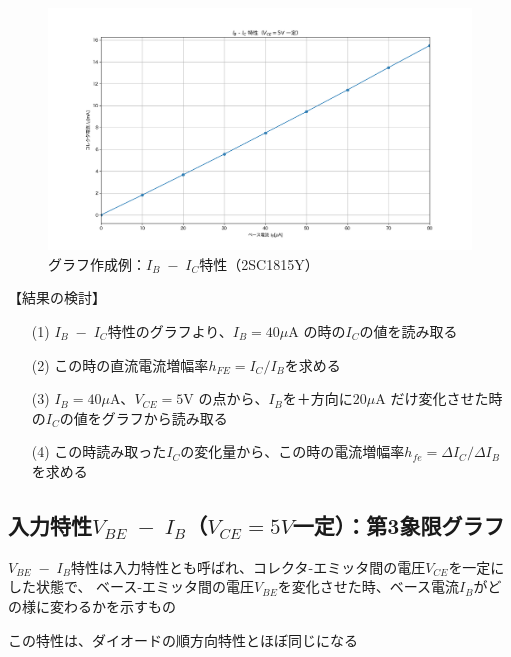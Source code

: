 \documentclass[uplatex,a4paper,11pt,oneside,openany]{jsbook}
\begin{document}
\begin{figure}[H]
  \centering
   \includegraphics[keepaspectratio, scale=0.45, angle=0]
               {figs/png/x2static.png}
               \caption{グラフ作成例：$I_B\;-\;I_C$特性（2SC1815Y）}
               \label{fig:iocharM1Yd}
\end{figure}

【結果の検討】

\begin{enumerate}
\item[(1)] $I_B\;-\;I_C$特性のグラフより、$I_B=40\mu$A の時の$I_C$の値を読み取る\\
\item[(2)] この時の直流電流増幅率$h_{FE}=I_C/I_B$を求める\\
\item[(3)] $I_B=40\mu$A、$V_{CE}=5$V の点から、$I_B$を＋方向に$20\mu$A だけ変化させた時の$I_C$の値をグラフから読み取る\\
\item[(4)] この時読み取った$I_C$の変化量から、この時の電流増幅率$h_{fe}=\Delta I_C/\Delta I_B$を求める
\end{enumerate}

\newpage

\subsection{入力特性$V_{BE}\;-\;I_B$（$V_{CE}=5V$一定）：第3象限グラフ}

$V_{BE}\;-\;I_B$特性は入力特性とも呼ばれ、コレクタ-エミッタ間の電圧$V_{CE}$を一定にした状態で、
ベース-エミッタ間の電圧$V_{BE}$を変化させた時、ベース電流$I_B$がどの様に変わるかを示すもの

この特性は、ダイオードの順方向特性とほぼ同じになる\\
\end{document}
